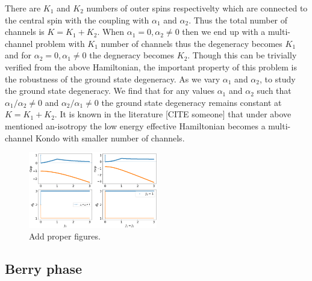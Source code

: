 \documentclass[reprint,prb,superscriptaddress]{revtex4-1}
\begin{document}
%
%
%
There are $K_1$ and $K_2$ numbers of outer spins respectivelty which are connected to the central spin with the coupling with $\alpha_1$ and $\alpha_2$. Thus the total number of channels is $K=K_1+K_2$. When $\alpha_1=0, \alpha_2\neq 0$ then we end up with a multi-channel problem with $K_1$ number of channels thus the degeneracy becomes $K_1$ and for $\alpha_2=0, \alpha_1\neq 0$ the degneracy becomes $K_2$. Though this can be trivially verified from the above Hamiltonian, the important property of this problem is the robustness of the ground state degeneracy. As we vary $\alpha_1$ and $\alpha_2$, to study the ground state degeneracy. We find that for any values $\alpha_1$  and $\alpha_2$ such that $\alpha_1/\alpha_2\neq 0$ and $\alpha_2/\alpha_1\neq 0$ the ground state degeneracy remains constant at $K=K_1+K_2$. It is known in the literature [CITE someone] that under above mentioned an-isotropy the low energy effective Hamiltonian becomes a multi-channel Kondo with smaller number of channels.

\begin{figure}\centering
\includegraphics[width=0.5\textwidth]{plt/Anisotropy_Channel:3}
\caption{Add proper figures.}
\end{figure}


\subsection{Berry phase}
\end{document}
